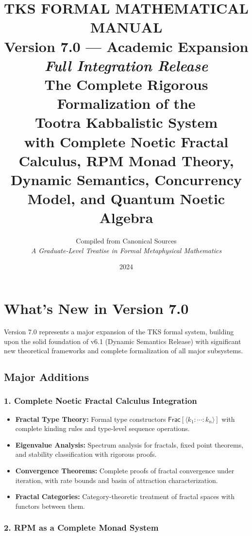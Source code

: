\documentclass[11pt,twoside,openright]{book}
\title{%
  \Huge\bfseries TKS FORMAL MATHEMATICAL MANUAL\\[0.5em]
  \Large Version 7.0 — Academic Expansion\\[0.5em]
  \large\textit{Full Integration Release}\\[1em]
  \normalsize The Complete Rigorous Formalization of the\\
  Tootra Kabbalistic System\\[0.5em]
  with Complete Noetic Fractal Calculus, RPM Monad Theory,\\
  Dynamic Semantics, Concurrency Model, and Quantum Noetic Algebra
}
\author{%
  Compiled from Canonical Sources\\[0.5em]
  \textit{A Graduate-Level Treatise in Formal Metaphysical Mathematics}
}
\date{2024}
\theoremstyle{definition}
\theoremstyle{plain}
\theoremstyle{remark}
\begin{document}
\frontmatter
\maketitle

\chapter*{What's New in Version 7.0}

\begin{tcolorbox}[colback=blue!5!white,colframe=blue!75!black,title=Version 7.0 — Academic Expansion Release]
Version 7.0 represents a major expansion of the TKS formal system, building upon the solid foundation of v6.1 (Dynamic Semantics Release) with significant new theoretical frameworks and complete formalization of all major subsystems.
\end{tcolorbox}

\section*{Major Additions}

\subsection*{1. Complete Noetic Fractal Calculus Integration}

\begin{itemize}
  \item \textbf{Fractal Type Theory:} Formal type constructors $\mathsf{Frac}[\langle k_1:\cdots:k_n \rangle]$ with complete kinding rules and type-level sequence operations.
  \item \textbf{Eigenvalue Analysis:} Spectrum analysis for fractals, fixed point theorems, and stability classification with rigorous proofs.
  \item \textbf{Convergence Theorems:} Complete proofs of fractal convergence under iteration, with rate bounds and basin of attraction characterization.
  \item \textbf{Fractal Categories:} Category-theoretic treatment of fractal spaces with functors between them.
\end{itemize}

\subsection*{2. RPM as a Complete Monad System}
\end{document}
